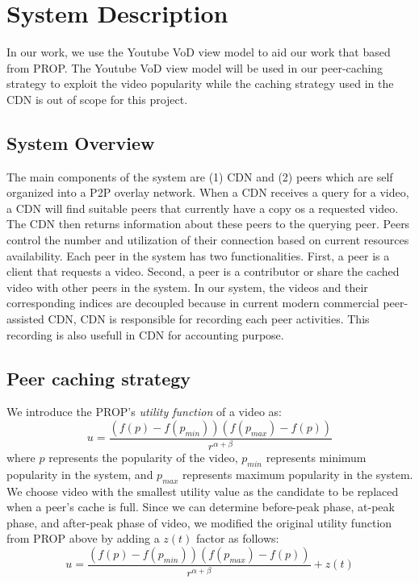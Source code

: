 \documentclass[10pt,final,journal,a4paper]{IEEEtran}
\begin{document}
\section{System Description}\label{systemdescription}
In our work, we use the Youtube VoD view model to aid our work that based from PROP. 
The Youtube VoD view model will be used in our peer-caching strategy to exploit the video popularity while the caching strategy used in the CDN is out of scope for this project. 

\subsection{System Overview}\label{systemoverview}
The main components of the system are (1) CDN and (2) peers which are self organized into a P2P overlay network.
When a CDN receives a query for a video, a CDN will find suitable peers that currently have a copy os a requested video.
The CDN then returns information about these peers to the querying peer.
Peers control the number and utilization of their connection based on current resources availability.
Each peer in the system has two functionalities.
First, a peer is a client that requests a video. 
Second, a peer is a contributor or share the cached video with other peers in the system. 
In our system, the videos and their corresponding indices are decoupled because in current modern commercial peer-assisted CDN, CDN is responsible for recording each peer activities.  
This recording is also usefull in CDN for accounting purpose.


\subsection{Peer caching strategy}\label{peercachingstrategy}
We introduce the PROP's \textit{utility function} of a video as:
\begin{equation}
u = \frac{ (f(p) - f(p_{min})) (f(p_{max}) - f(p)) }{r^{\alpha + \beta}} 
\end{equation}
where $p$ represents the popularity of the video, $p_{min}$ represents minimum popularity in the system, and $p_{max}$ represents maximum popularity in the system.
We choose video with the smallest utility value as the candidate to be replaced when a peer's cache is full.
Since we can determine before-peak phase, at-peak phase, and after-peak phase of video, we modified the original utility function from PROP above by adding a $z(t)$ factor as follows:
\begin{equation}
u = \frac{ (f(p) - f(p_{min})) (f(p_{max}) - f(p)) }{r^{\alpha + \beta}} + z(t)
\end{equation}
\end{document}
